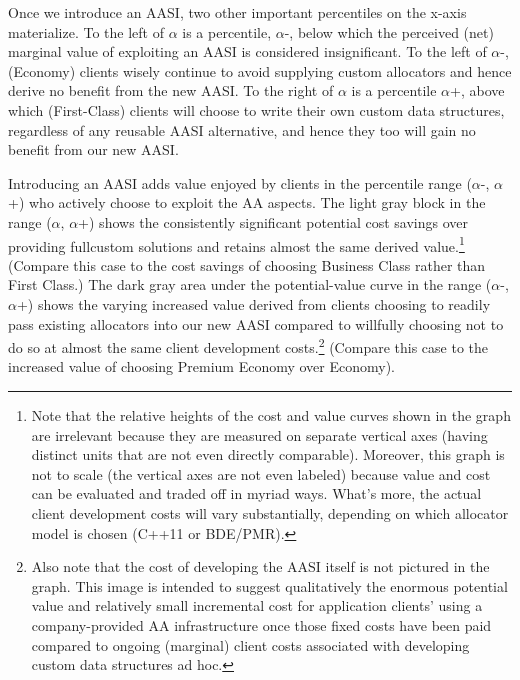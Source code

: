 
Once we introduce an AASI, two other important percentiles on the x-axis
materialize. To the left of $\alpha$ is a percentile, $\alpha$-, below which the perceived (net)
marginal value of exploiting an AASI is considered insignificant. To the left of $\alpha$-,
(Economy) clients wisely continue to avoid supplying custom allocators and hence
derive no benefit from the new AASI. To the right of $\alpha$ is a percentile $\alpha$+, above which
(First-Class) clients will choose to write their own custom data structures, regardless
of any reusable AASI alternative, and hence they too will gain no benefit from our
new AASI.

Introducing an AASI adds value enjoyed by clients in the percentile range ($\alpha$-, $\alpha$+)
who actively choose to exploit the AA aspects. The light gray block in the range ($\alpha$,
$\alpha$+) shows the consistently significant potential cost savings over providing fullcustom solutions and retains almost the same derived value.\footnote{Note that the relative heights of the cost and value curves shown in the graph are irrelevant
because they are measured on separate vertical axes (having distinct units that are not even directly
comparable). Moreover, this graph is not to scale (the vertical axes are not even labeled) because
value and cost can be evaluated and traded off in myriad ways. What’s more, the actual client
development costs will vary substantially, depending on which allocator model is chosen (C++11 or
BDE/PMR).} (Compare this case to
the cost savings of choosing Business Class rather than First Class.) The dark gray
area under the potential-value curve in the range ($\alpha$-, $\alpha$+) shows the varying
increased value derived from clients choosing to readily pass existing allocators into
our new AASI compared to willfully choosing not to do so at almost the same client
development costs.\footnote{Also note that the cost of developing the AASI itself is not pictured in the graph. This image is
intended to suggest qualitatively the enormous potential value and relatively small incremental cost
for application clients’ using a company-provided AA infrastructure once those fixed costs have been
paid compared to ongoing (marginal) client costs associated with developing custom data structures
ad hoc.}  (Compare this case to the increased value of choosing Premium
Economy over Economy).

